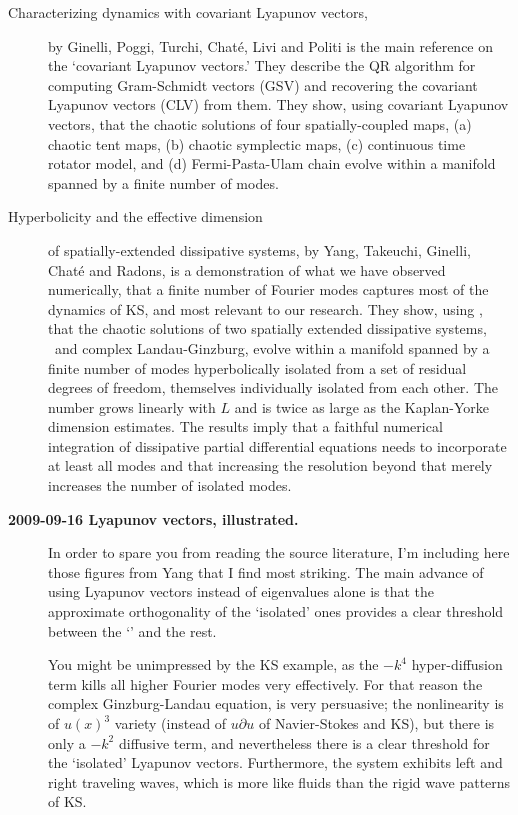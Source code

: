 \begin{description}
\item[Characterizing dynamics with covariant Lyapunov
              vectors,] by
Ginelli, Poggi, Turchi, Chat\'{e}, Livi and Politi
is the main reference on the
`covariant Lyapunov vectors.' They describe the QR algorithm for
computing Gram-Schmidt vectors (GSV) and recovering
the covariant Lyapunov vectors (CLV) from them.
They show, using covariant Lyapunov vectors, that
  the chaotic solutions of four spatially-coupled maps,
(a) chaotic tent maps,
(b) chaotic symplectic maps,
(c) continuous time rotator model, and
(d) Fermi-Pasta-Ulam chain
  evolve within a manifold spanned by a finite number
  of {\entangled} modes.

\item[Hyperbolicity and the effective dimension] of
    spatially-extended dissipative
    systems, by Yang, Takeuchi, Ginelli, Chat\'{e}
    and Radons,
 is a demonstration of what we
  have observed numerically, that a finite number of Fourier modes
  captures most of the dynamics of KS, and most relevant to our research.
 They show, using {\cLvs}, that
  the chaotic solutions of two spatially extended dissipative
  systems, \KS\ and complex Landau-Ginzburg,
  evolve within a manifold spanned by a finite number
  of {\entangled} modes hyperbolically isolated from a set of
  residual degrees of freedom, themselves individually
  isolated from each other. The number grows linearly with
  $L$ and is twice as large as the Kaplan-Yorke dimension estimates.
  The results imply that a
  faithful numerical integration of dissipative
  partial differential equations needs to incorporate at
  least all {\entangled} modes and that increasing the resolution
  beyond that
  merely increases the number of isolated modes.

\item[\bf 2009-09-16 Lyapunov vectors, illustrated.]
In order to spare you from reading the source literature, I'm including here
those figures from Yang \etal{} that I find most striking.
The main advance of using Lyapunov vectors instead of eigenvalues alone
is that the approximate orthogonality of the `isolated' ones provides a clear
threshold between the `{\entangled}' and the rest.

You might be unimpressed by the KS example, as the $-k^4$ hyper-diffusion
term kills all higher Fourier modes very effectively. For that reason the
complex Ginzburg-Landau equation, 
is very persuasive; the nonlinearity is
of $u(x)^3$ variety (instead of $u \partial u$ of Navier-Stokes and
KS), but there is only a $-k^2$ diffusive term, and nevertheless there
is a clear threshold for the `isolated' Lyapunov vectors. Furthermore,
the system exhibits left and right traveling waves, which is more like
fluids than the rigid wave patterns of KS.


\end{description}
